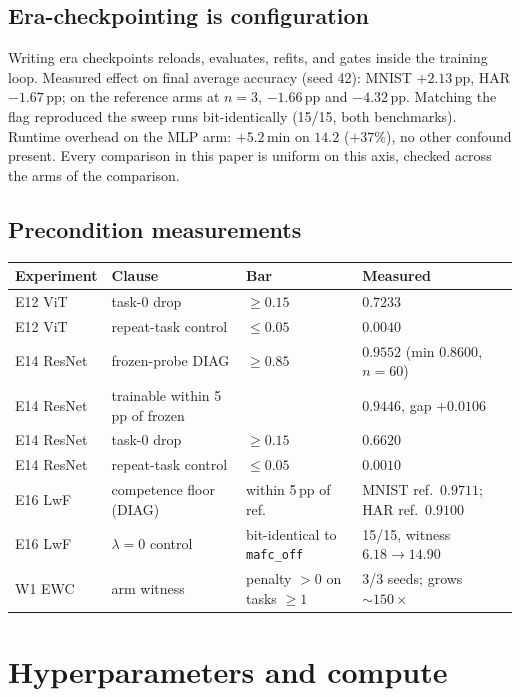 \subsection{Era-checkpointing is configuration}

Writing era checkpoints reloads, evaluates, refits, and gates inside the
training loop. Measured effect on final average accuracy (seed 42):
MNIST $+2.13$\,pp, HAR $-1.67$\,pp; on the reference arms at $n{=}3$,
$-1.66$\,pp and $-4.32$\,pp. Matching the flag reproduced the sweep runs
bit-identically (15/15, both benchmarks). Runtime overhead on the MLP arm:
$+5.2$\,min on $14.2$ ($+37\%$), no other confound present. Every comparison in
this paper is uniform on this axis, checked across the arms of the comparison.

\subsection{Precondition measurements}

\begin{center}\small
\begin{tabular}{@{}llll@{}}
\toprule
Experiment & Clause & Bar & Measured \\
\midrule
E12 ViT & task-0 drop & $\ge 0.15$ & $0.7233$ \\
E12 ViT & repeat-task control & $\le 0.05$ & $0.0040$ \\
E14 ResNet & frozen-probe DIAG & $\ge 0.85$ & $0.9552$ (min $0.8600$, $n{=}60$) \\
E14 ResNet & trainable within 5\,pp of frozen & & $0.9446$, gap $+0.0106$ \\
E14 ResNet & task-0 drop & $\ge 0.15$ & $0.6620$ \\
E14 ResNet & repeat-task control & $\le 0.05$ & $0.0010$ \\
E16 LwF & competence floor (DIAG) & within 5\,pp of ref. & MNIST ref.\ $0.9711$; HAR ref.\ $0.9100$ \\
E16 LwF & $\lambda{=}0$ control & bit-identical to \texttt{mafc\_off} & 15/15, witness $6.18 \rightarrow 14.90$ \\
W1 EWC & arm witness & penalty $>0$ on tasks $\ge 1$ & 3/3 seeds; grows $\sim150\times$ \\
\bottomrule
\end{tabular}
\end{center}

\section{Hyperparameters and compute}
\label{app:hyperparams}

